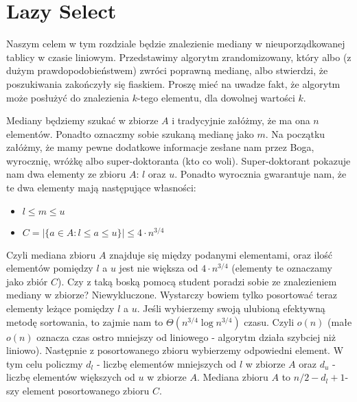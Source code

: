 \section{Lazy Select}

\label{sec:lazy}

Naszym celem w tym rozdziale będzie znalezienie mediany w nieuporządkowanej tablicy w czasie liniowym.
Przedstawimy algorytm zrandomizowany, który albo (z dużym prawdopodobieństwem) zwróci poprawną medianę, albo stwierdzi, że poszukiwania zakończyły się fiaskiem.
Proszę mieć na uwadze fakt, że algorytm może posłużyć do znalezienia $k$-tego elementu, dla dowolnej wartości $k$.

Mediany będziemy szukać w zbiorze $A$ i tradycyjnie załóżmy, że ma ona $n$ elementów.
Ponadto oznaczmy sobie szukaną medianę jako $m$.
Na początku załóżmy, że mamy pewne dodatkowe informacje zesłane nam przez Boga, wyrocznię, wróżkę albo super-doktoranta (kto co woli).
Super-doktorant pokazuje nam dwa elementy ze zbioru $A$: $l$ oraz $u$.
Ponadto wyrocznia gwarantuje nam, że te dwa elementy mają następujące własności:
\begin{itemize}
 \item $l \leq m \leq u$
 \item $C = |\{a \in A: l \leq a \leq u\}| \leq 4 \cdot n^{3/4}$
\end{itemize}
Czyli mediana zbioru $A$ znajduje się między podanymi elementami, oraz ilość elementów pomiędzy $l$ a $u$ jest nie większa od $4 \cdot n^{3/4}$ (elementy te oznaczamy jako zbiór $C$).
Czy z taką boską pomocą student poradzi sobie ze znalezieniem mediany w zbiorze?
Niewykluczone.
Wystarczy bowiem tylko posortować teraz elementy leżące pomiędzy $l$ a $u$.
Jeśli wybierzemy swoją ulubioną efektywną metodę sortowania, to zajmie nam to $\Theta(n^{3/4} \log n^{3/4})$ czasu.
Czyli $o(n)$ (małe $o(n)$ oznacza czas ostro mniejszy od liniowego - algorytm działa szybciej niż liniowo).
Następnie z posortowanego zbioru wybierzemy odpowiedni element.
W tym celu policzmy $d_l$ - liczbę elementów mniejszych od $l$ w zbiorze $A$ oraz $d_u$ - liczbę elementów większych od $u$ w zbiorze $A$.
Mediana zbioru $A$ to $n/2 - d_l + 1$-szy element posortowanego zbioru $C$.

